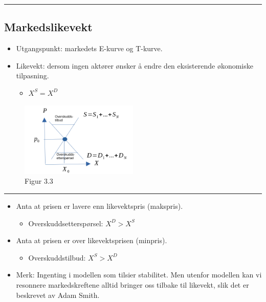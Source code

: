 \documentclass[
  letterpaper,
  DIV=11,
  numbers=noendperiod]{scrartcl}
\providecommand{\tightlist}{%
  \setlength{\itemsep}{0pt}\setlength{\parskip}{0pt}}\usepackage{longtable,booktabs,array}
\begin{document}
\begin{center}\rule{0.5\linewidth}{0.5pt}\end{center}

\subsection{Markedslikevekt}\label{markedslikevekt}

\begin{itemize}
\tightlist
\item
  Utgangspunkt: markedets E-kurve og T-kurve.
\item
  Likevekt: dersom ingen aktører ønsker å endre den eksisterende
  økonomiske tilpasning.

  \begin{itemize}
  \tightlist
  \item
    \(X^S = X^D\)
  \end{itemize}
\end{itemize}

\begin{figure}[H]

{\centering \includegraphics[width=0.5\textwidth,height=\textheight]{drawio/telikevekt.png}

}

\caption{Figur 3.3}

\end{figure}%

\begin{center}\rule{0.5\linewidth}{0.5pt}\end{center}

\begin{itemize}
\tightlist
\item
  Anta at prisen er lavere enn likevektspris (makspris).

  \begin{itemize}
  \tightlist
  \item
    Overskuddsetterspørsel: \(X^D > X^S\)
  \end{itemize}
\item
  Anta at prisen er over likevektsprisen (minpris).

  \begin{itemize}
  \tightlist
  \item
    Overskuddstilbud: \(X^S > X^D\)
  \end{itemize}
\item
  Merk: Ingenting i modellen som tilsier stabilitet. Men utenfor
  modellen kan vi resonnere markedskreftene alltid bringer oss tilbake
  til likevekt, slik det er beskrevet av Adam Smith.
\end{itemize}
\end{document}
